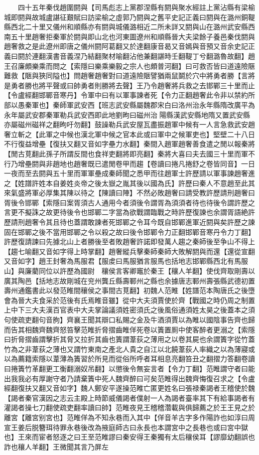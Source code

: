 　　四十五年秦伐趙圍閼與【司馬彪志上黨郡涅縣有閼與聚水經註上黨沾縣有梁榆城即閼與故城盧諶征艱賦曰訪梁榆之虛郭乃閼與之舊平史記正義曰閼與在潞州銅鞮縣西北二十里又儀州和順縣亦有閼與城儀潞相近二所未詳又閼與山在潞州武安縣西南五十里趙奢拒秦軍於閼與即山北也河東圖遼州和順縣晉大夫梁餘子養邑秦伐閼與趙奢救之是此遼州即唐之儀州閼阿葛翻又於達翻康音曷又音嫣與音預又音余史記正義曰閼於連翻漢書音義涅乃結翻聚材喻翻沾他兼翻諶時壬翻鞮丁兮翻潞魯故翻】趙王召廉頗樂乘而問之【索隱曰樂乘樂毅之宗人也頗普河翻】曰可救否皆曰道遠險陿難救【陿與狹同隘也】問趙奢趙奢對曰道遠險陿譬猶兩鼠鬬於穴中將勇者勝【言將是勇者勝也將平聲或曰帥勇者則勝將去聲】王乃令趙奢將兵救之去邯鄲三十里而止【令盧經翻邯鄲音寒丹】令軍中曰有以軍事諫者死【令力正翻趙奢此令非以禁約所部以愚秦軍也】秦師軍武安西【班志武安縣屬魏郡宋白曰洛州治永年縣隋改廣平為永年屬武安郡秦軍勒兵武安西即此地劉昫曰磁州治陽縣漢武安縣地隋又置武安縣亦屬磁州磁祥之翻昫吁勿翻】鼓譟勒兵武安屋瓦盡振趙軍中候有一人言急救武安趙奢立斬之【此軍之中候也漢北軍中候之官本此或曰軍中之候軍吏也】堅壁二十八日不行復益增壘【復扶又翻又音如字壘力水翻】秦間入趙軍趙奢善食遣之閒以報秦將【閒古莧翻此孫子所謂反間也食祥吏翻將即亮翻】秦將大喜曰夫去國三十里而軍不行乃增壘閼與非趙地也趙奢既已遣閒卷甲而趨【卷讀曰捲凡捲舒之卷皆同音】一日一夜而至去閼與五十里而軍軍壘成秦師聞之悉甲而往趙軍士許歷請以軍事諫趙奢進之【姓譜許姓本自姜姓炎帝之後太嶽之胤其後以國為氏】許歷曰秦人不意趙至此其來氣盛將軍必厚集其陳以待之【陳讀曰陣】不然必敗趙奢曰請受教許歷請刑趙奢曰胥後令邯鄲【索隱曰案胥須古人通用今者須後令謂胥為須須者待也待後令謂許歷之言更不擬誅之故更待後令也邯鄲二字當為欲戰謂臨戰之時許歷復諫也余謂胥語絶許歷請刑趙奢令其且待也蓋謂敢諫者死邯鄲之令耳今既自邯鄲進軍近閼與矣許歷之諫固在邯鄲之後不當用邯鄲之令以殺之故曰後令邯鄲令力正翻邯鄲音寒丹令力丁翻】許歷復請諫曰先據北山上者勝後至者敗趙奢許諾即發萬人趨之秦師後至争山不得上【趨七喻翻又音如字得上時掌翻】趙奢縱兵擊秦師秦師大敗解閼與而還【還從宣翻又音如字】趙王封奢為馬服君【服䖍曰馬服猶言服馬也括地志邯鄲縣西北有馬服山】與廉藺同位以許歷為國尉　穰侯言客卿竈於秦王【穰人羊翻】使伐齊取剛壽以廣其陶邑【括地志故剛城在兖州龔丘縣壽鄆州之縣也余據唐志鄆州壽張縣武德初置壽州通鑑書此以發范睢間穰侯之事間古莧翻】初魏人范睢【姓譜范本陶唐氏之後墮會為晉大夫食采於范後有氏焉睢音雖】從中大夫須賈使於齊【戰國之時仍周之制置上中下三大夫漢百官表中大夫掌論議須姓密須氏之後風俗通須姓太昊之後蓋本之須句使疏吏翻句音朐】齊襄王聞其辯口私賜之金及牛酒須賈以為睢以國陰事告齊也歸而告其相魏齊魏齊怒笞擊范睢折脅摺齒睢佯死卷以簀置厠中使客醉者更溺之【索隱曰折脅摺齒謂擊折其脅又拉折其齒也簀謂葦荻之薄用之以卷其屍也余謂簀字從竹蓋竹為之非葦荻之薄也又謂竹東南之產北人貴之自江以北饒葦荻人率織之以為薄寢或以為薦籍索隱以葦薄為簀習於所見而從俗所呼者耳相息亮翻笞丑之翻摺力答翻卷讀曰捲簀竹革翻更工衡翻溺奴吊翻】以懲後令無妄言者【令力丁翻】范睢謂守者曰能出我我必有厚謝守者乃請棄簀中死人魏齊醉曰可矣范睢得出魏齊悔復召求之【令盧經翻復扶又翻又音如字】魏人鄭安平遂操范睢亡匿更姓名曰張禄秦謁者王稽使於魏【謁者秦官漢因之志云主殿上時節威儀謁者僕射一人為謁者臺率其下有給事謁者有灌謁者操七刀翻使疏吏翻率讀曰帥】范睢夜見王稽稽濳載與俱歸薦之於王王見之於離宮【離宮别宮也】范睢佯為不知永巷而入其中【佯音羊古字多作陽詐也如淳曰周宣王姜后脱簪珥待罪永巷後改為掖庭師古曰永長也本謂宮中之長巷也或曰宮中獄也】王來而宦者怒逐之曰王至范睢謬曰秦安得王秦獨有太后穰侯耳【謬靡幼翻誤也詐也穰人羊翻】王微聞其言乃屏左